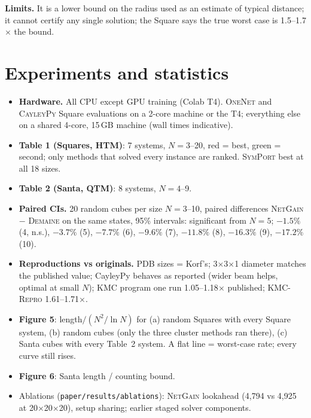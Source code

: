 \documentclass[10.5pt,a4paper]{article}
\newcommand{\Cu}[1]{#1$\times$#1$\times$#1}
\newcommand{\Sq}[1]{#1$\times$#1$\times$1}
\newcommand{\M}[1]{\textsc{#1}}
\begin{document}
\textbf{Limits.} It is a lower bound on the radius used as an estimate of typical distance; it cannot certify any single solution;
the Square says the true worst case is 1.5--1.7$\times$ the bound.

\section{Experiments and statistics}
\begin{itemize}
\item \textbf{Hardware.} All CPU except GPU training (Colab T4). \M{OneNet} and \M{CayleyPy} Square evaluations on a 2-core machine or
the T4; everything else on a shared 4-core, 15\,GB machine (wall times indicative).
\item \textbf{Table 1 (Squares, HTM)}: 7 systems, $N=3$--20, red = best, green = second; only methods that solved every instance are
ranked. \M{SymPort} best at all 18 sizes.
\item \textbf{Table 2 (Santa, QTM)}: 8 systems, $N=4$--9.
\item \textbf{Paired CIs.} 20 random cubes per size $N=3$--10, paired differences \M{NetGain} $-$ \M{Demaine} on the same states,
95\% intervals: significant from $N=5$; $-1.5\%$ (4, n.s.), $-3.7\%$ (5), $-7.7\%$ (6), $-9.6\%$ (7), $-11.8\%$ (8), $-16.3\%$ (9),
$-17.2\%$ (10).
\item \textbf{Reproductions vs originals.} PDB sizes = Korf's; \Sq{3} diameter matches the published value; CayleyPy behaves as
reported (wider beam helps, optimal at small $N$); KMC program one run 1.05--1.18$\times$ published; \M{KMC-Repro} 1.61--1.71$\times$.
\item \textbf{Figure 5}: length$/(N^2/\ln N)$ for (a) random Squares with every Square system, (b) random cubes (only the three cluster
methods ran there), (c) Santa cubes with every Table~2 system. A flat line = worst-case rate; every curve still rises.
\item \textbf{Figure 6}: Santa length / counting bound.
\item Ablations (\texttt{paper/results/ablations}): \M{NetGain} lookahead (4,794 vs 4,925 at \Cu{20}), setup sharing; earlier staged
solver components.
\end{itemize}

\end{document}

